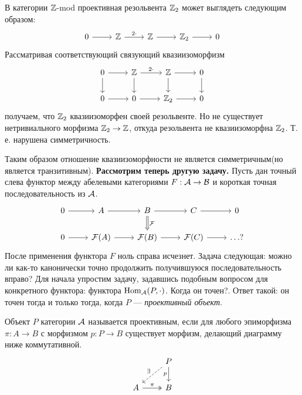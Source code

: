 \documentclass[../main.tex]{subfiles}
\begin{document}
\begin{to_ex}
В категории $\mathbb{Z}$-mod проективная резольвента $\mathbb{Z}_2$ может выглядеть следующим образом:
\begin{equation*}
    \begin{tikzcd}
	0 & \Z & \Z & {\Z_2} & 0
	\arrow[from=1-1, to=1-2]
	\arrow["2\cdot", from=1-2, to=1-3]
	\arrow[from=1-3, to=1-4]
	\arrow[from=1-4, to=1-5]
\end{tikzcd}
\end{equation*}
Рассматривая соответствующий связующий квазиизоморфизм
\begin{equation*}
    \begin{tikzcd}
	0 & \Z & \Z & 0 \\
	0 & 0 & {\Z_2} & 0
	\arrow[from=1-1, to=1-2]
	\arrow["2\cdot", from=1-2, to=1-3]
	\arrow[from=1-3, to=1-4]
	\arrow[from=1-3, to=2-3]
	\arrow[from=1-4, to=2-4]
	\arrow[from=1-2, to=2-2]
	\arrow[from=1-1, to=2-1]
	\arrow[from=2-1, to=2-2]
	\arrow[from=2-2, to=2-3]
	\arrow[from=2-3, to=2-4]
\end{tikzcd}
\end{equation*}
получаем, что $\mathbb{Z}_2$ квазиизоморфен своей резольвенте. Но не существует нетривиального морфизма $\mathbb{Z}_2\to \mathbb{Z}$, откуда резольвента не квазиизоморфна $\mathbb{Z}_2$. Т. е. нарушена симметричность.
\end{to_ex}
Таким образом отношение квазиизоморфности не является симметричным(но является транзитивным).
\textbf{Рассмотрим теперь другую задачу.} Пусть дан точный слева функтор между абелевыми категориями $F:\mathcal{A} \to \mathcal{B}$ и короткая точная последовательность из $\mathcal{A}$.
\begin{equation*}
\begin{tikzcd}
	0 & A & B & C & 0 \\
	0 & {\F(A)} & {\F(B)} & {\F(C)} & {\ldots ?}
	\arrow[from=1-1, to=1-2]
	\arrow[from=1-2, to=1-3]
	\arrow[from=1-3, to=1-4]
	\arrow[from=1-4, to=1-5]
	\arrow[from=2-1, to=2-2]
	\arrow[from=2-2, to=2-3]
	\arrow[from=2-3, to=2-4]
	\arrow[from=2-4, to=2-5]
	\arrow["\F", Rightarrow, from=1-3, to=2-3]
\end{tikzcd}
\end{equation*}
После применения функтора $F$ ноль справа исчезнет. Задача следующая: можно ли как-то канонически точно продолжить получившуюся последовательность вправо?
Для начала упростим задачу, задавшись подобным вопросом для конкретного функтора: функтора $\operatorname{Hom}_{\mathcal{A}}(P, \cdot)$. Когда он точен?. Ответ такой: он точен тогда и только тогда, когда $P$ --- \emph{проективный объект}.
\begin{to_def}
Объект $P$ категории $\mathcal{A}$ называется проективным, если для любого эпиморфизма $\pi: A\to B$ с морфизмом $p:P\to B$ существует морфизм, делающий диаграмму ниже коммутативной.
\begin{equation}\label{projective_def_diagram}
\begin{tikzcd}
	& P \\
	A & B
	\arrow["\pi", two heads, from=2-1, to=2-2]
	\arrow["p"', from=1-2, to=2-2]
	\arrow["\exists"', dashed, from=1-2, to=2-1]
\end{tikzcd}
\end{equation}
\end{to_def}
\end{document}
